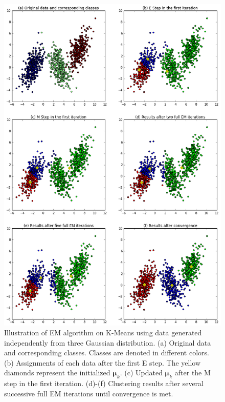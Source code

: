\begin{figure}
	\begin{center}
		\includegraphics[width=\textwidth]{images/EM4KMeans.png}
		\caption{Illustration of EM algorithm on K-Means using data generated independently from three Gaussian distribution. (a) Original data and corresponding classes. Classes are denoted in different colors. (b) Assignments of each data after the first E step. The yellow diamonds represent the initialized \(\boldsymbol{\mu}_k\). (c) Updated \(\boldsymbol{\mu}_k\) after the M step in the first iteration. (d)-(f) Clustering results after several successive full EM iterations until convergence is met.}
		\label{fig:EM4KMeans}
	\end{center}
\end{figure}

